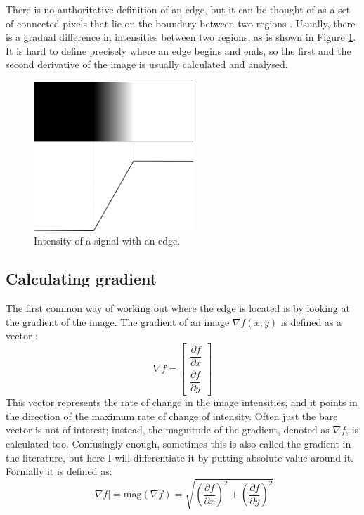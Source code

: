 \documentclass[
  digital,     %
  oneside,     %
  nosansbold,  %
  nocolorbold, %
  lof,         %
  lot,         %
]{fithesis4}
\begin{document}
There is no authoritative definition of an edge, but it can be thought of as a
set of connected pixels that lie on the boundary between two regions
\cite{gonzalez2002}. Usually, there is a gradual difference in intensities
between two regions, as is shown in Figure \ref{fig:edge_intensities}. It is
hard to define precisely where an edge begins and ends, so the first and the
second derivative of the image is usually calculated and analysed.


\begin{figure}
    \begin{center}
        \includegraphics[width=6cm]{resources/inkscape/gradient.png}
    \end{center}
    \caption{Intensity of a signal with an edge.}
    \label{fig:edge_intensities}
\end{figure}

\subsection{Calculating gradient}

The first common way of working out where the edge is located is by looking at
the gradient of the image. The gradient of an image $\nabla f(x,y)$ is defined
as a vector \cite{gonzalez2002}:
$$\nabla f =
\begin{bmatrix}
    \dfrac{\partial f}{\partial x}\\[2ex]
    \dfrac{\partial f}{\partial y}
\end{bmatrix}$$
This vector represents the rate of change in the image intensities, and it points in
the direction of the maximum rate of change of intensity. Often just the bare
vector is not of interest; instead, the magnitude of the gradient, denoted as
$\nabla f$, is calculated too. Confusingly enough, sometimes this is also called
the gradient in the literature, but here I will differentiate it by putting
absolute value around it. Formally it is defined as:
$$|\nabla f| = \text{mag}(\nabla f) = \sqrt{(\frac{\partial f}{\partial x})^2 +
(\frac{\partial f}{\partial y})^2}$$
\end{document}
